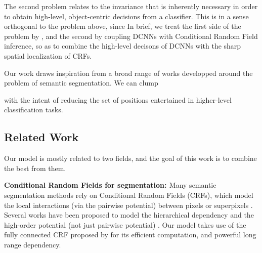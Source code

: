 The second problem relates to the invariance that is inherently necessary in order to obtain high-level, object-centric decisions from a classifier. This is in a sense orthogonal to the problem above, since 
In brief, we treat the first side of the problem by , and the second by coupling DCNNs with Conditional Random Field inference, so as to combine the high-level decisons of DCNNs with the sharp spatial localization of CRFs.

Our work draws inspiration from a broad range of works developped around the problem of semantic segmentation. We can clump 

 with the intent of reducing the set of positions entertained in higher-level classification tasks. 
\subsection{Related Work}
Our model is mostly related to two fields, and the goal of this work is to combine the best from them.

{\bf{Conditional Random Fields for segmentation: }} Many semantic segmentation methods rely on Conditional Random Fields (CRFs), which model the local interactions (via the pairwise potential) between pixels \citep{rother2004grabcut, shotton2009textonboost} or superpixels \citep{lucchi2011spatial}. Several works have been proposed to model the hierarchical dependency \citep{he2004multiscale, ladicky2009associative, lempitsky2011pylon} and the high-order potential (not just pairwise potential) \citep{delong2012fast, gonfaus2010harmony, kohli2009robust, krahenbuhl2011efficient}. Our model takes use of the fully connected CRF proposed by \citet{krahenbuhl2011efficient} for its efficient computation, and powerful long range dependency.

